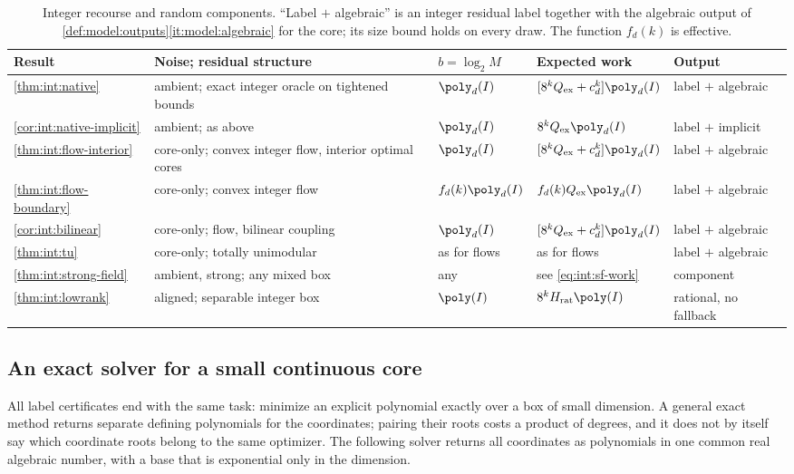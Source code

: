 \begin{table}[t]
\centering
\caption{Integer recourse and random components. ``Label $+$ algebraic'' is
an integer residual label together with the algebraic output of
\cref{def:model:outputs}\ref{it:model:algebraic} for the core; its size bound
holds on every draw. The function $f_d(k)$ is effective.}
\label{tab:int:summary}
\small
\begin{tabularx}{\textwidth}{@{}lXlll@{}}
\toprule
Result & Noise; residual structure & $b=\log_2M$ & Expected work & Output\\
\midrule
\cref{thm:int:native} & ambient; exact integer oracle on tightened bounds
& $\poly_d(I)$ & $[8^kQ_{\rm ex}+c_d^k]\poly_d(I)$ & label $+$ algebraic\\
\cref{cor:int:native-implicit} & ambient; as above & $\poly_d(I)$
& $8^kQ_{\rm ex}\poly_d(I)$ & label $+$ implicit\\
\cref{thm:int:flow-interior} & core-only; convex integer flow, interior
optimal cores & $\poly_d(I)$ & $[8^kQ_{\rm ex}+c_d^k]\poly_d(I)$
& label $+$ algebraic\\
\cref{thm:int:flow-boundary} & core-only; convex integer flow
& $f_d(k)\poly_d(I)$ & $f_d(k)Q_{\rm ex}\poly_d(I)$ & label $+$ algebraic\\
\cref{cor:int:bilinear} & core-only; flow, bilinear coupling & $\poly_d(I)$
& $[8^kQ_{\rm ex}+c_d^k]\poly_d(I)$ & label $+$ algebraic\\
\cref{thm:int:tu} & core-only; totally unimodular & as for flows
& as for flows & label $+$ algebraic\\
\cref{thm:int:strong-field} & ambient, strong; any mixed box & any
& see \eqref{eq:int:sf-work} & component\\
\cref{thm:int:lowrank} & aligned; separable integer box & $\poly(I)$
& $8^kH_{\rm rat}\poly(I)$ & rational, no fallback\\
\bottomrule
\end{tabularx}
\end{table}

\subsection{An exact solver for a small continuous core}\label{sec:int:solver}

All label certificates end with the same task: minimize an explicit
polynomial exactly over a box of small dimension. A general exact method
returns separate defining polynomials for the coordinates; pairing their
roots costs a product of degrees, and it does not by itself say which
coordinate roots belong to the same optimizer. The following solver returns
all coordinates as polynomials in one common real algebraic number, with a
base that is exponential only in the dimension.

